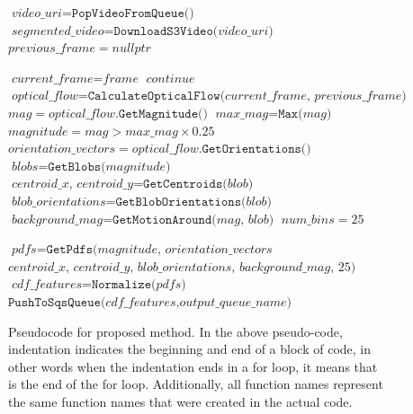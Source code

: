 \begin{figure}[h]
\begin{algorithmic}[1]
  \State $\textit{video\_uri} = \texttt{PopVideoFromQueue()}$
  \State $\textit{segmented\_video} = \texttt{DownloadS3Video(}\textit{video\_uri}\texttt{)}$
  \State $\textit{previous\_frame} = nullptr$

   
    \State $\textit{current\_frame} = \textit{frame}$
      \State $continue$
    \EndIf
    \State $\textit{optical\_flow} = \texttt{CalculateOpticalFlow(}\textit{current\_frame, previous\_frame} \texttt{)}$
    \State $\textit{mag} = \textit{optical\_flow}.\texttt{GetMagnitude()}$
    \State $\textit{max\_mag} = \texttt{Max(} \textit{mag} \texttt{)}$
    \State $\textit{magnitude} = \textit{mag} > \textit{max\_mag} \times 0.25$
    \State $\textit{orientation\_vectors} = \textit{optical\_flow}.\texttt{GetOrientations()}$
    \State $\textit{blobs} = \texttt{GetBlobs(} \textit{magnitude}\texttt{)}$
      \State $\textit{centroid\_x, centroid\_y} = \texttt{GetCentroids(} \textit{blob} \texttt{)}$
      \State $\textit{blob\_orientations} = \texttt{GetBlobOrientations(} \textit{blob} \texttt{)}$
      \State $\textit{background\_mag} = \texttt{GetMotionAround(} \textit{mag, blob} \texttt{)}$
    \EndFor
    \State $\textit{num\_bins} = 25$

    \State $\textit{pdfs} = \texttt{GetPdfs(} \textit{magnitude, orientation\_vectors} $
    \Statex $\textit{centroid\_x, centroid\_y, blob\_orientations, background\_mag, 25} \texttt{)}$
  \EndFor
  \State $\textit{cdf\_features} = \texttt{Normalize(}\textit{pdfs}\texttt{)}$
  \State $\texttt{PushToSqsQueue(}\textit{cdf\_features}, \textit{output\_queue\_name} \texttt{)}$

\end{algorithmic}

\caption{Pseudocode for proposed method. In the above pseudo-code, indentation
indicates the beginning and end of a block of code, in other words when the
indentation ends in a for loop, it means that is the end of the for loop. Additionally,
all function names represent the same function names that were created in the actual
code.}
\label{alg:pseudo_compute_node}

\end{figure}

